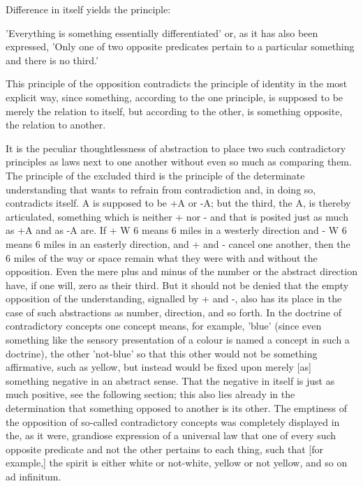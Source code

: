     Difference in itself yields the principle:

    'Everything is something essentially differentiated' or,
    as it has also been expressed,
    'Only one of two opposite predicates pertain to
    a particular something and there is no third.'

    This principle of the opposition contradicts
    the principle of identity in the most explicit way,
    since something, according to the one principle,
    is supposed to be merely the relation to itself,
    but according to the other, is something opposite,
    the relation to another.

    It is the peculiar thoughtlessness of abstraction to place
    two such contradictory principles as laws next to one another
    without even so much as comparing them.
    The principle of the excluded third is the
    principle of the determinate understanding that wants to refrain
    from contradiction and, in doing so, contradicts itself.
    A is supposed to be +A or -A;
    but the third, the A, is thereby articulated,
    something which is neither + nor - and that is posited just as much
    as +A and as -A are.
    If + W 6 means 6 miles in a westerly direction
    and - W 6 means 6 miles in an easterly direction,
    and + and - cancel one another, then the 6 miles of the way or
    space remain what they were with and without the opposition.
    Even the mere plus and minus of the number or the abstract direction
    have, if one will, zero as their third.
    But it should not be denied that the empty opposition of the understanding,
    signalled by + and -, also has its place in the case of such abstractions
    as number, direction, and so forth.
    In the doctrine of contradictory concepts one concept means, for
    example, 'blue' (since even something like the sensory presentation
    of a colour is named a concept in such a doctrine),
    the other 'not-blue' so that this other would not be something affirmative,
    such as yellow, but instead would be fixed upon merely [as]
    something negative in an abstract sense.
    That the negative in itself is just as much positive,
    see the following section; this also lies already
    in the determination that something opposed to another
    is its other.
    The emptiness of the opposition of so-called
    contradictory concepts was completely displayed in the, as it were,
    grandiose expression of a universal law that one of every such
    opposite predicate and not the other pertains to each thing, such
    that [for example,] the spirit is either white or not-white,
    yellow or not yellow, and so on ad infinitum.

